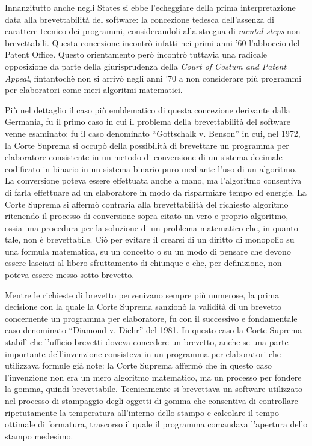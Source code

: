Innanzitutto anche negli States si ebbe l'echeggiare della prima interpretazione data alla brevettabilità del software: la concezione tedesca dell'assenza di carattere tecnico dei programmi, considerandoli alla stregua di \textit{mental steps} non brevettabili. Questa concezione incontrò infatti nei primi anni '60 l'abboccio del Patent Office. Questo orientamento però incontrò tuttavia una radicale opposizione da parte della giurisprudenza della \textit{Court of Costum and Patent Appeal}, fintantochè non si arrivò negli anni '70 a non considerare più programmi per elaboratori come meri algoritmi matematici.

Più nel dettaglio il caso più emblematico di questa concezione derivante dalla Germania, fu il primo caso in cui il problema della brevettabilità del software venne esaminato: fu il caso denominato ``Gottschalk v. Benson'' in cui, nel 1972, la Corte Suprema si occupò della possibilità di brevettare un programma per elaboratore consistente in un metodo di conversione di un sistema decimale codificato in binario in un sistema binario puro mediante l'uso di un algoritmo. La conversione poteva essere effettuata anche a mano, ma l'algoritmo consentiva di farla effettuare ad un elaboratore in modo da risparmiare tempo ed energie. La Corte Suprema si affermò contraria alla brevettabilità del richiesto algoritmo ritenendo il processo di conversione sopra citato un vero e proprio algoritmo, ossia una procedura per la soluzione di un problema matematico che, in quanto tale, non è brevettabile. Ciò per evitare il crearsi di un diritto di monopolio su una formula matematica, su un concetto o su un modo di pensare che devono essere lasciati al libero sfruttamento di chiunque e che, per definizione, non poteva essere messo sotto brevetto.

Mentre le richieste di brevetto pervenivano sempre più numerose, la prima decisione con la quale la Corte Suprema sanzionò la validità di un brevetto concernente un programma per elaboratore, fu con il successivo e fondamentale caso denominato ``Diamond v. Diehr'' del 1981. In questo caso la Corte Suprema stabilì che l'ufficio brevetti doveva concedere un brevetto, anche se una parte importante dell'invenzione consisteva in un programma per elaboratori che utilizzava formule già note: la Corte Suprema affermò che in questo caso l'invenzione non era un mero algoritmo matematico, ma un processo per fondere la gomma, quindi brevettabile. Tecnicamente si brevettava un software utilizzato nel processo di stampaggio degli oggetti di gomma che consentiva di controllare ripetutamente la temperatura all'interno dello stampo e calcolare il tempo ottimale di formatura, trascorso il quale il programma comandava l'apertura dello stampo medesimo.

